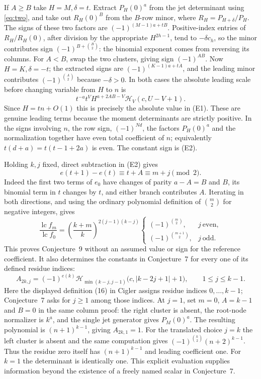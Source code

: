 \documentclass[11pt,a4paper]{article}
\begin{document}
If $A\ge B$ take $H=M,\delta=t$. Extract $P_H(0)^a$ from the jet determinant using \eqref{eq:two}, and take out $R_H(0)^B$ from the $B$-row minor, where $R_H=P_{H+\delta}/P_H$. The signs of these two factors are $(-1)^{(M-1)a+tB}$. Positive-index entries of $R_H/R_H(0)$, after division by the appropriate $H^{2h-1}$, tend to $-\delta c_h$, so the minor contributes sign $(-1)^{B+\binom B2}$: the binomial exponent comes from reversing its columns. For $A<B$, swap the two clusters, giving sign $(-1)^{AB}$. Now $H=K,\delta=-t$; the extracted signs are $(-1)^{(K-1)a+tA}$, and the leading minor contributes $(-1)^{\binom A2}$ because $-\delta>0$. In both cases the absolute leading scale before changing variable from $H$ to $n$ is
\[
 t^{-a}t^V H^{a+2AB-V}\mathcal H_V(c,U-V+1).
\]
Since $H=tn+O(1)$ this is precisely the absolute value in (E1). These are genuine leading terms because the moment determinants are strictly positive. In the signs involving $n$, the row sign, $(-1)^{Nd}$, the factors $P_H(0)^a$ and the normalization together have even total coefficient of $n$; equivalently $t(d+a)=t(t-1+2a)$ is even. The constant sign is (E2).

Holding $k,j$ fixed, direct subtraction in (E2) gives
\[
 e(t+1)-e(t)\equiv t+A\equiv m+j\pmod2.
\]
Indeed the first two terms of $e_0$ have changes of parity $a-A=B$ and $B$, its binomial term in $t$ changes by $t$, and either branch contributes $A$. Iterating in both directions, and using the ordinary polynomial definition of $\binom m2$ for negative integers, gives
\[
 \frac{\operatorname{lc}f_m}{\operatorname{lc}f_0}
 =\left(\frac{k+m}{k}\right)^{2(j-1)(k-j)}
 \begin{cases}(-1)^{\binom m2},&j\ \text{even},\\
 (-1)^{\binom{m+1}{2}},&j\ \text{odd}.
 \end{cases}
\]
This proves Conjecture~9 without an assumed value or sign for the reference coefficient. It also determines the constants in Conjecture~7 for every one of its defined residue indices:
\[
 A_{2k,j}=(-1)^{e(k)}\mathcal H_{\min(k-j,j-1)}
 \bigl(c,|k-2j+1|+1\bigr),\qquad 1\le j\le k-1 .
\]
Here the displayed definition (16) in Cigler assigns residue indices $0,\ldots,k-1$; Conjecture~7 asks for $j\ge1$ among those indices. At $j=1$, set $m=0$, $A=k-1$ and $B=0$ in the same column proof: the right cluster is absent, the root-node normalizer is $k^a$, and the single jet generator gives $P_M(0)^a$. The resulting polynomial is $(n+1)^{k-1}$, giving $A_{2k,1}=1$. For the translated choice $j=k$ the left cluster is absent and the same computation gives $(-1)^{\binom k2}(n+2)^{k-1}$. Thus the residue zero itself has $(n+1)^{k-1}$ and leading coefficient one. For $k=1$ the determinant is identically one. This explicit evaluation supplies information beyond the existence of a freely named scalar in Conjecture~7.
\end{document}
